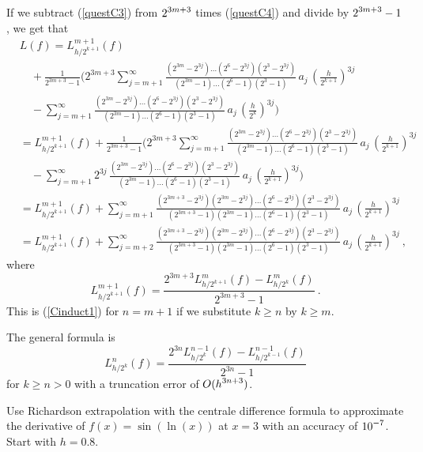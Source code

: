 {If we subtract (\ref{questC3}) from $\displaystyle 2^{3m+3}$ times
(\ref{questC4}) and divide by $\displaystyle 2^{3m+3}-1$, we get that
\begin{align*}
&L(f) = L_{h/2^{k+1}}^{m+1}(f) \\
&\quad + \frac{1}{2^{3m+3}-1}
\bigg( 2^{3m+3} \sum_{j=m+1}^\infty
\frac{(2^{3m}-2^{3j}) \ldots (2^6-2^{3j})(2^3-2^{3j})}
{(2^{3m}-1)\ldots(2^6-1)(2^3-1)}\, a_j\, \left(\frac{h}{2^{k+1}}\right)^{3j} \\
&\quad -\sum_{j=m+1}^\infty
\frac{(2^{3m}-2^{3j}) \ldots (2^6-2^{3j})(2^3-2^{3j})}
{(2^{3m}-1)\ldots(2^6-1)(2^3-1)}\, a_j\, \left(\frac{h}{2^k}\right)^{3j}
\bigg) \\
&= L_{h/2^{k+1}}^{m+1}(f) + \frac{1}{2^{3m+3}-1}
\bigg( 2^{3m+3} \sum_{j=m+1}^\infty
\frac{(2^{3m}-2^{3j}) \ldots (2^6-2^{3j})(2^3-2^{3j})}
{(2^{3m}-1)\ldots(2^6-1)(2^3-1)}\, a_j\, \left(\frac{h}{2^{k+1}}\right)^{3j} \\
& \quad -\sum_{j=m+1}^\infty
2^{3j} \,\frac{(2^{3m}-2^{3j}) \ldots (2^6-2^{3j})(2^3-2^{3j})}
{(2^{3m}-1)\ldots(2^6-1)(2^3-1)}\, a_j\, \left(\frac{h}{2^{k+1}}\right)^{3j}
\bigg) \\
&= L_{h/2^{k+1}}^{m+1}(f) + \sum_{j=m+1}^\infty
\frac{(2^{3m+3} - 2^{3j})(2^{3m}-2^{3j}) \ldots (2^6-2^{3j})(2^3-2^{3j})}
{(2^{3m+3}-1)(2^{3m}-1)\ldots(2^6-1)(2^3-1)}\,
a_j\, \left(\frac{h}{2^{k+1}}\right)^{3j} \\
&= L_{h/2^{k+1}}^{m+1}(f) + \sum_{j=m+2}^\infty
\frac{(2^{3m+3} - 2^{3j})(2^{3m}-2^{3j}) \ldots (2^6-2^{3j})(2^3-2^{3j})}
{(2^{3m+3}-1)(2^{3m}-1)\ldots(2^6-1)(2^3-1)}\,
 a_j\, \left(\frac{h}{2^{k+1}}\right)^{3j} \ ,
\end{align*}
where
\[
L_{h/2^{k+1}}^{m+1}(f) = \frac{2^{3m+3}L_{h/2^{k+1}}^m(f)-L_{h/2^k}^m(f)}
{2^{3m+3}-1} \ .
\]
This is (\ref{Cinduct1}) for $n=m+1$ if we substitute
$k \geq n$ by $k\geq m$.

The general formula is
\[
L_{h/2^k}^n(f) = \frac{2^{3n} L_{h/2^k}^{n-1}(f) -
  L_{h/2^{k-1}}^{n-1}(f)}{2^{3n} -1}
\]
for $k \geq n > 0$ with a truncation error of $\displaystyle O(h^{3n+3})$.
}

\begin{question}
Use Richardson extrapolation with the centrale difference formula to
approximate the derivative of $f(x)=\sin(\ln(x))$ at $x=3$ with an
accuracy of $\displaystyle 10^{-7}$.  Start with $h=0.8$.
\end{question}

